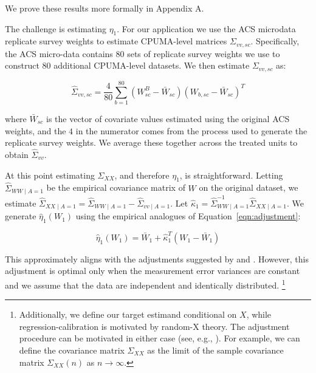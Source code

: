 \documentclass[aoas]{imsart}
\theoremstyle{plain}
\theoremstyle{remark}
\begin{document}
We prove these results more formally in Appendix A. 

The challenge is estimating $\eta_1$. For our application we use the ACS microdata replicate survey weights to estimate CPUMA-level matrices $\Sigma_{vv, sc}$. Specifically, the ACS micro-data contains 80 sets of replicate survey weights we use to construct 80 additional CPUMA-level datasets. We then estimate $\Sigma_{vv, sc}$ as:

\begin{equation}
\hat{\Sigma}_{vv, sc} = \frac{4}{80}\sum_{b=1}^{80}(W_{sc}^B - \bar{W}_{sc})(W_{b, sc} - \bar{W}_{sc})^T
\end{equation}

where $\bar{W}_{sc}$ is the vector of covariate values estimated using the original ACS weights, and the $4$ in the numerator comes from the process used to generate the replicate survey weights. We average these together across the treated units to obtain $\hat{\Sigma}_{vv}$.

At this point estimating $\Sigma_{XX}$, and therefore $\eta_1$, is straightforward. Letting $\hat{\Sigma}_{WW \mid A = 1}$ be the empirical covariance matrix of $W$ on the original dataset, we estimate $\hat{\Sigma}_{XX \mid A = 1} = \hat{\Sigma}_{WW \mid A = 1} - \hat{\Sigma}_{vv \mid A = 1}$. Let $\hat{\kappa}_1 = \hat{\Sigma}_{WW \mid A = 1}^{-1}\hat{\Sigma}_{XX \mid A = 1}$. We generate $\hat{\eta}_1(W_1)$ using the empirical analogues of Equation~\ref{eqn:adjustment}:

\begin{equation}
\hat{\eta}_1(W_1) = \bar{W}_1 + \hat{\kappa}_1^T(W_1 - \bar{W}_1)
\end{equation}

This approximately aligns with the adjustments suggested by \cite{carroll2006measurement} and \cite{gleser1992importance}. However, this adjustment is optimal only when the measurement error variances are constant and we assume that the data are independent and identically distributed. \footnote{Additionally, we define our target estimand conditional on $X$, while regression-calibration is motivated by random-X theory. The adjustment procedure can be motivated in either case (see, e.g., \cite{gleser1992importance}). For example, we can define the covariance matrix $\Sigma_{XX}$ as the limit of the sample covariance matrix $\Sigma_{XX}(n)$ as $n\to\infty$.} 
\end{document}
